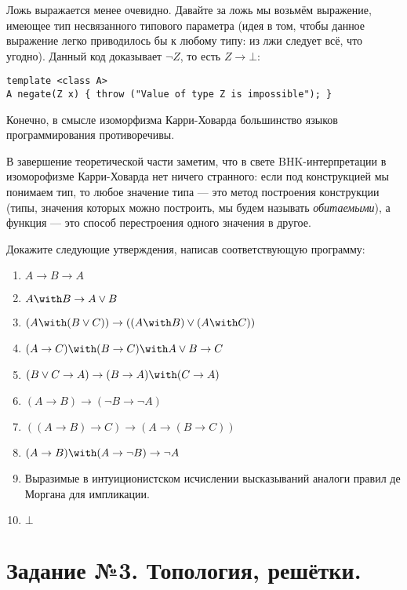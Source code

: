 \documentclass[10pt,a4paper,oneside]{article}
\begin{document}
\begin{enumerate}
Ложь выражается менее очевидно. Давайте за ложь мы возьмём выражение, имеющее тип несвязанного типового параметра
(идея в том, чтобы данное выражение легко приводилось бы к любому типу: из лжи следует всё, что угодно). 
Данный код доказывает $\neg Z$, то есть $Z \rightarrow \bot$: 
\begin{verbatim}
template <class A>   
A negate(Z x) { throw ("Value of type Z is impossible"); }
\end{verbatim}

Конечно, в смысле изоморфизма Карри-Ховарда большинство языков программирования противоречивы.

В завершение теоретической части заметим, что в свете BHK-интерпретации в изоморофизме Карри-Ховарда нет
ничего странного: если под конструкцией мы понимаем тип, то любое значение типа --- это метод построения конструкции
(типы, значения которых можно построить, мы будем называть \emph{обитаемыми}), 
а функция --- это способ перестроения одного значения в другое.

Докажите следующие утверждения, написав соответствующую программу:
\begin{enumerate}
\item $A \rightarrow B \rightarrow A$
\item $A \with B \rightarrow A \vee B$
\item $(A \with (B \vee C)) \rightarrow ((A \with B) \vee (A \with C))$
\item $(A \rightarrow C) \with (B \rightarrow C) \with A \vee B \rightarrow C$
\item $(B \vee C \rightarrow A) \rightarrow (B \rightarrow A) \with (C \rightarrow A)$
\item $(A \rightarrow B) \rightarrow (\neg B \rightarrow \neg A)$
\item $((A \rightarrow B) \rightarrow C) \rightarrow (A \rightarrow (B \rightarrow C))$
\item $(A \rightarrow B) \with (A \rightarrow \neg B) \rightarrow \neg A$
\item Выразимые в интуиционистском исчислении высказываний аналоги правил де Моргана для импликации.
\item $\bot$
\end{enumerate}
\end{enumerate}

\section*{Задание №3. Топология, решётки.}
\end{document}
